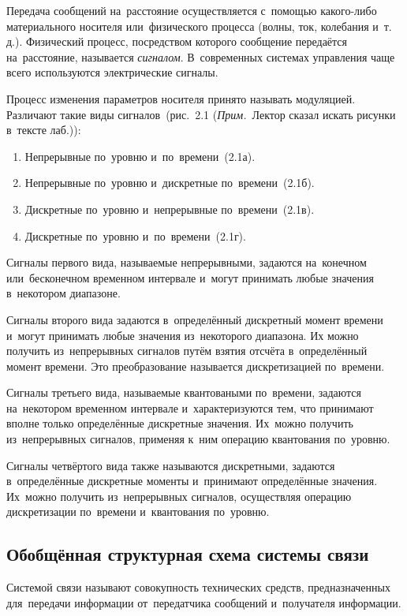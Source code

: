 \documentclass[
	a4paper,
	oneside,
	BCOR = 10mm,
	DIV = 12,
	12pt,
	headings = normal,
]{scrartcl}
\newcommand{\mynote}[1]{(\textit{Прим.}~#1)}
\begin{document}
			Передача сообщений на~расстояние осуществляется с~помощью какого-либо материального носителя или~физического процесса (волны, ток, колебания и~т.\,д.). Физический процесс, посредством которого сообщение передаётся на~расстояние, называется \emph{сигналом}. В~современных системах управления чаще всего используются электрические сигналы.

			Процесс изменения параметров носителя принято называть модуляцией. Различают такие виды сигналов~(рис.~2.1 \mynote{Лектор сказал искать рисунки в~тексте лаб.}):
			\begin{enumerate}
				\item Непрерывные по~уровню и~по~времени~(2.1а).
				\item Непрерывные по~уровню и~дискретные по~времени~(2.1б).
				\item Дискретные по~уровню и~непрерывные по~времени~(2.1в).
				\item Дискретные по~уровню и~по~времени~(2.1г).
			\end{enumerate}

			Сигналы первого вида, называемые непрерывными, задаются на~конечном или~бесконечном временном интервале и~могут принимать любые значения в~некотором диапазоне. 

			Сигналы второго вида задаются в~определённый дискретный момент времени и~могут принимать любые значения из~некоторого диапазона. Их можно получить из~непрерывных сигналов путём взятия отсчёта в~определённый момент времени. Это преобразование называется дискретизацией по~времени.

			Сигналы третьего вида, называемые квантоваными по~времени, задаются на~некотором временном интервале и~характеризуются тем, что принимают вполне только определённые дискретные значения. Их~можно получить из~непрерывных сигналов, применяя к~ним операцию квантования по~уровню.

			Сигналы четвёртого вида также называются дискретными, задаются в~определённые дискретные моменты и~принимают определённые значения. Их~можно получить из~непрерывных сигналов, осуществляя операцию дискретизации по~времени и~квантования по~уровню.

		\subsection{Обобщённая структурная схема системы связи}
			Системой связи называют совокупность технических средств, предназначенных для~передачи информации от~передатчика сообщений и~получателя информации.
\end{document}
